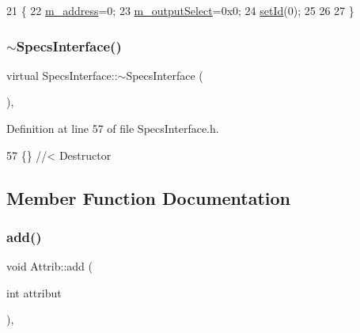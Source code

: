 \begin{DoxyCode}
21                               \{
22   \hyperlink{classSpecsInterface_a4064da5ca6e0a172363967c4acc0b365}{m\_address}=0;
23   \hyperlink{classSpecsInterface_a660cb4112ce1c071f277cb6ec115b411}{m\_outputSelect}=0x0;
24   \hyperlink{classObject_a398fe08cba594a0ce6891d59fe4f159f}{setId}(0);
25 
26 
27 \}
\end{DoxyCode}
\mbox{\label{classSpecsInterface_a914c632c299fa854be1ff9387b4d8939}} 
\subsubsection{\texorpdfstring{$\sim$\+Specs\+Interface()}{~SpecsInterface()}}
{\footnotesize\ttfamily virtual Specs\+Interface\+::$\sim$\+Specs\+Interface (\begin{DoxyParamCaption}{ }\end{DoxyParamCaption})\hspace{0.3cm}{\ttfamily [inline]}, {\ttfamily [virtual]}}



Definition at line 57 of file Specs\+Interface.\+h.


\begin{DoxyCode}
57 \{\} \textcolor{comment}{//< Destructor}
\end{DoxyCode}


\subsection{Member Function Documentation}
\mbox{\label{classAttrib_a235f773af19c900264a190b00a3b4ad7}} 
\subsubsection{\texorpdfstring{add()}{add()}}
{\footnotesize\ttfamily void Attrib\+::add (\begin{DoxyParamCaption}\item[{int}]{attribut }\end{DoxyParamCaption})\hspace{0.3cm}{\ttfamily [inline]}, {\ttfamily [inherited]}}

